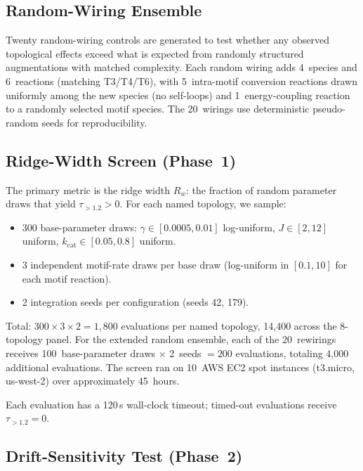 \documentclass[twocolumn,showpacs,preprintnumbers,amsmath,amssymb,prd,floatfix]{revtex4-2}
\newcommand{\tauexp}{\tau_{>1.2}}
\newcommand{\kcat}{k_{\mathrm{cat}}}
\newcommand{\Rw}{R_w}
\begin{document}
\subsection{Random-Wiring Ensemble}
\label{sec:random_ensemble}

Twenty random-wiring controls are generated to test whether any observed topological effects exceed what is expected from randomly structured augmentations with matched complexity. Each random wiring adds 4~species and 6~reactions (matching T3/T4/T6), with 5~intra-motif conversion reactions drawn uniformly among the new species (no self-loops) and 1~energy-coupling reaction to a randomly selected motif species. The 20~wirings use deterministic pseudo-random seeds for reproducibility.

\subsection{Ridge-Width Screen (Phase~1)}
\label{sec:phase1}

The primary metric is the ridge width $\Rw$: the fraction of random parameter draws that yield $\tauexp > 0$. For each named topology, we sample:

\begin{itemize}
\item 300 base-parameter draws: $\gamma \in [0.0005, 0.01]$ log-uniform, $J \in [2, 12]$ uniform, $\kcat \in [0.05, 0.8]$ uniform.
\item 3 independent motif-rate draws per base draw (log-uniform in $[0.1, 10]$ for each motif reaction).
\item 2 integration seeds per configuration (seeds 42, 179).
\end{itemize}

Total: $300 \times 3 \times 2 = 1{,}800$ evaluations per named topology, 14{,}400 across the 8-topology panel. For the extended random ensemble, each of the 20~rewirings receives 100~base-parameter draws $\times$ 2~seeds $= 200$ evaluations, totaling 4{,}000 additional evaluations. The screen ran on 10~AWS EC2 spot instances (t3.micro, us-west-2) over approximately 45~hours.

Each evaluation has a 120\,s wall-clock timeout; timed-out evaluations receive $\tauexp = 0$.

\subsection{Drift-Sensitivity Test (Phase~2)}
\label{sec:phase2}
\end{document}
